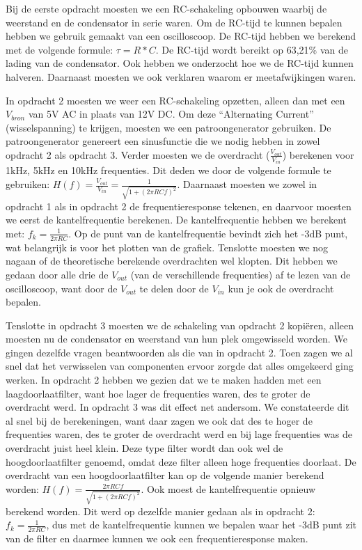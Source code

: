 \documentclass[12pt]{article}
\begin{document}
Bij de eerste opdracht moesten we een RC-schakeling opbouwen waarbij de weerstand en de condensator in serie waren. Om de RC-tijd te kunnen bepalen hebben we gebruik gemaakt van een oscilloscoop. 
De RC-tijd hebben we berekend met de volgende formule: \(\tau = R*C\). De RC-tijd wordt bereikt op 63,21\% van de lading van de condensator. 
Ook hebben we onderzocht hoe we de RC-tijd kunnen halveren. Daarnaast moesten we ook verklaren waarom er meetafwijkingen waren. 

In opdracht 2 moesten we weer een RC-schakeling opzetten, alleen dan met een $V_{bron}$ van 5V AC in plaats van 12V DC. Om deze ``Alternating Current'' (wisselspanning) te krijgen, moesten we een patroongenerator gebruiken. 
De patroongenerator genereert een sinusfunctie die we nodig hebben in zowel opdracht 2 als opdracht 3. Verder moesten we de overdracht ($\frac{V_{out}}{V_{in}}$) berekenen voor 1kHz, 5kHz en 10kHz frequenties. 
Dit deden we door de volgende formule te gebruiken: $H(f)=\frac{V_{out}}{V_{in}} = \frac{1}{\sqrt{1+(2\pi RC f)^2}}$. Daarnaast moesten we zowel in opdracht 1 als in opdracht 2 de frequentieresponse tekenen, en daarvoor moesten we eerst de kantelfrequentie berekenen. 
De kantelfrequentie hebben we berekent met: $f_k=\frac{1}{2\pi RC}$. Op de punt van de kantelfrequentie bevindt zich het -3dB punt, wat belangrijk is voor het plotten van de grafiek. 
Tenslotte moesten we nog nagaan of de theoretische berekende overdrachten wel klopten. Dit hebben we gedaan door alle drie de $V_{out}$ (van de verschillende frequenties) af te lezen van de oscilloscoop, want door de $V_{out}$ te delen door de $V_{in}$ kun je ook de overdracht bepalen. 

Tenslotte in opdracht 3 moesten we de schakeling van opdracht 2 kopiëren, alleen moesten nu de condensator en weerstand van hun plek omgewisseld worden. 
We gingen dezelfde vragen beantwoorden als die van in opdracht 2. Toen zagen we al snel dat het verwisselen van componenten ervoor zorgde dat alles omgekeerd ging werken. 
In opdracht 2 hebben we gezien dat we te maken hadden met een laagdoorlaatfilter, want hoe lager de frequenties waren, des te groter de overdracht werd. 
In opdracht 3 was dit effect net andersom. We constateerde dit al snel bij de berekeningen, want daar zagen we ook dat des te hoger de frequenties waren, des te groter de overdracht werd en bij lage frequenties was de overdracht juist heel klein. 
Deze type filter wordt dan ook wel de hoogdoorlaatfilter genoemd, omdat deze filter alleen hoge frequenties doorlaat. De overdracht van een hoogdoorlaatfilter kan op de volgende manier berekend worden: $H(f)=\frac{2\pi RCf}{\sqrt{1+(2\pi RC f)^2}}$. 
Ook moest de kantelfrequentie opnieuw berekend worden. Dit werd op dezelfde manier gedaan als in opdracht 2: $f_k=\frac{1}{2\pi RC}$, dus met de kantelfrequentie kunnen we bepalen waar het -3dB punt zit van de filter en daarmee kunnen we ook een frequentieresponse maken. 
\end{document}
